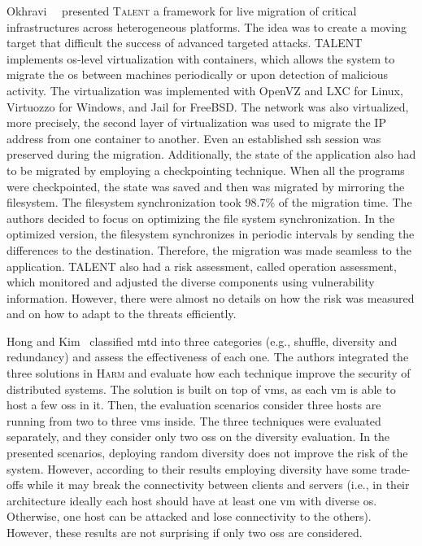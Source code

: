 Okhravi~\etal{}~\cite{Okhravi:2014} presented \textsc{Talent} a framework for live migration of critical infrastructures across heterogeneous platforms. 
The idea was to create a moving target that difficult the success of advanced targeted attacks. 
TALENT implements \gls{os}-level virtualization with containers, which allows the system to migrate the \gls{os} between machines periodically or upon detection of malicious activity. 
The virtualization was implemented with OpenVZ and LXC for Linux, Virtuozzo for Windows, and Jail for FreeBSD. 
The network was also virtualized, more precisely, the second layer of virtualization was used to migrate the IP address from one container to another. 
Even an established ssh session was preserved during the migration. 
Additionally, the state of the application also had to be migrated by employing a checkpointing technique. 
When all the programs were checkpointed, the state was saved and then was migrated by mirroring the filesystem. 
The filesystem synchronization took 98.7\% of the migration time. 
The authors decided to focus on optimizing the file system synchronization. 
In the optimized version, the filesystem synchronizes in periodic intervals by sending the differences to the destination. 
Therefore, the migration was made seamless to the application. 
TALENT also had a risk assessment, called operation assessment, which monitored and adjusted the diverse components using vulnerability information. 
However, there were almost no details on how the risk was measured and on how to adapt to the threats efficiently.


Hong and Kim~\cite{Hong:2015} classified \gls{mtd} into three categories (e.g., shuffle, diversity and redundancy) and assess the effectiveness of each one. 
The authors integrated the three solutions in \textsc{Harm} and evaluate how each technique improve the security of distributed systems.
The solution is built on top of \glspl{vm}, as each \gls{vm} is able to host a few \glspl{os} in it.
Then, the evaluation scenarios consider three hosts are running from two to three \glspl{vm} inside.
The three techniques were evaluated separately, and they consider only two \glspl{os} on the diversity evaluation.
In the presented scenarios, deploying random diversity does not improve the risk of the system. However, according to their results employing diversity have some trade-offs while it may break the connectivity between clients and servers (i.e., in their architecture ideally each host should have at least one \gls{vm} with diverse \gls{os}. 
Otherwise, one host can be attacked and lose connectivity to the others).
However, these results are not surprising if only two \glspl{os} are considered. 

